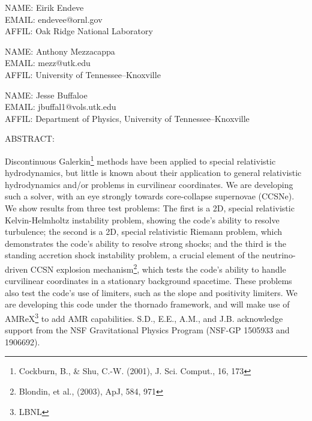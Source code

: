 \documentclass[11pt]{article}
\begin{document}

NAME: Eirik Endeve \\
EMAIL: endevee@ornl.gov \\
AFFIL: Oak Ridge National Laboratory

NAME: Anthony Mezzacappa \\
EMAIL: mezz@utk.edu \\
AFFIL: University of Tennessee--Knoxville

NAME: Jesse Buffaloe \\
EMAIL: jbuffal1@vols.utk.edu \\
AFFIL: Department of Physics, University of Tennessee--Knoxville

ABSTRACT:

Discontinuous Galerkin\footnote{Cockburn, B., \& Shu, C.-W. (2001), J. Sci. Comput., 16, 173} methods have been applied to special relativistic hydrodynamics, but little is known about their application to general relativistic hydrodynamics and/or problems in curvilinear coordinates. We are developing such a solver, with an eye strongly towards core-collapse supernovae (CCSNe). We show results from three test problems: The first is a 2D, special relativistic Kelvin-Helmholtz instability problem, showing the code's ability to resolve turbulence; the second is a 2D, special relativistic Riemann problem, which demonstrates the code's ability to resolve strong shocks; and the third is the standing accretion shock instability problem, a crucial element of the neutrino-driven CCSN explosion mechanism\footnote{Blondin, et al., (2003), ApJ, 584, 971}, which tests the code's ability to handle curvilinear coordinates in a stationary background spacetime. These problems also test the code's use of limiters, such as the slope and positivity limiters. We are developing this code under the thornado framework, and will make use of AMReX\footnote{LBNL} to add AMR capabilities. S.D., E.E., A.M., and J.B. acknowledge support from the NSF Gravitational Physics Program (NSF-GP 1505933 and 1906692).

\end{document}
